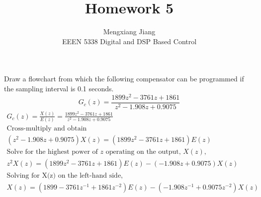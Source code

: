 \documentclass[12pt]{article}
\newenvironment{problem}[2][Problem]{\begin{trivlist}
\item[\hskip \labelsep {\bfseries #1}\hskip \labelsep {\bfseries #2.}]}{\end{trivlist}}
\begin{document}
 
 
\title{Homework 5}%
\author{Mengxiang Jiang\\ %
EEEN 5338 Digital and DSP Based Control} %
 
\maketitle
 
\begin{problem}{1} %
    Draw a flowchart from which the following compensator can be programmed if the sampling interval is 0.1 seconds.
    $$ G_c(z) = \frac{1899z^2-3761z+1861}{z^2-1.908z+0.9075}$$
    \begin{align*}
        G_c(z) = \frac{X(z)}{E(z)} = \frac{1899z^2-3761z+1861}{z^2-1.908z+0.9075}\\
        \text{Cross-multiply and obtain}\\
        (z^2-1.908z+0.9075)X(z) = (1899z^2-3761z+1861)E(z)\\
        \text{Solve for the highest power of $z$ operating on the output, $X(z)$,}\\
        z^2X(z) = (1899z^2-3761z+1861)E(z) - (-1.908z + 0.9075)X(z)\\
        \text{Solving for X(z) on the left-hand side,}\\
        X(z) = (1899-3761z^{-1}+1861z^{-2})E(z) - (-1.908z^{-1}+0.9075z^{-2})X(z)
    \end{align*}

\end{problem}

 
\end{document}
